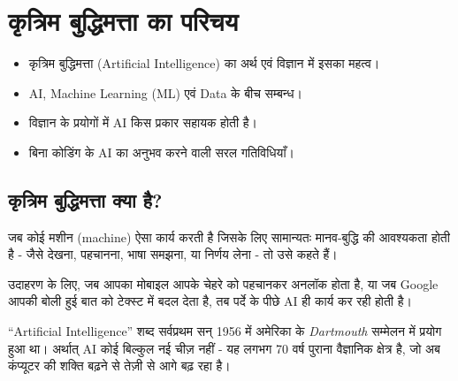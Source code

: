 \chapter{कृत्रिम बुद्धिमत्ता का परिचय}
\label{ch:intro}

\lakshyaheading
\begin{itemize}[leftmargin=1.4em]
  \item कृत्रिम बुद्धिमत्ता (Artificial Intelligence) का अर्थ एवं विज्ञान में इसका महत्व।
  \item AI, Machine Learning (ML) एवं Data के बीच सम्बन्ध।
  \item विज्ञान के प्रयोगों में AI किस प्रकार सहायक होती है।
  \item बिना कोडिंग के AI का अनुभव करने वाली सरल गतिविधियाँ।
\end{itemize}

\section{कृत्रिम बुद्धिमत्ता क्या है?}

जब कोई मशीन (machine) ऐसा कार्य करती है जिसके लिए सामान्यतः मानव-बुद्धि की आवश्यकता
होती है - जैसे देखना, पहचानना, भाषा समझना, या निर्णय लेना - तो उसे
 कहते हैं।

उदाहरण के लिए, जब आपका मोबाइल आपके चेहरे को पहचानकर अनलॉक होता है, या जब Google आपकी
बोली हुई बात को टेक्स्ट में बदल देता है, तब पर्दे के पीछे AI ही कार्य कर रही होती है।

\begin{jante}
“Artificial Intelligence” शब्द सर्वप्रथम सन् 1956 में अमेरिका के
\emph{Dartmouth} सम्मेलन में प्रयोग हुआ था। अर्थात् AI कोई बिल्कुल नई चीज़ नहीं - यह
लगभग 70 वर्ष पुराना वैज्ञानिक क्षेत्र है, जो अब कंप्यूटर की शक्ति बढ़ने से तेज़ी
से आगे बढ़ रहा है।
\end{jante}


